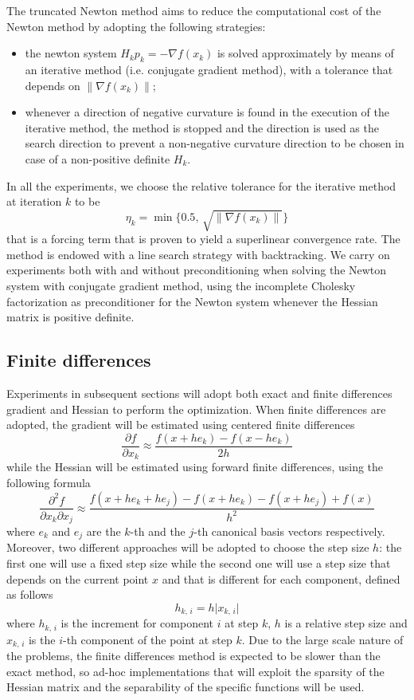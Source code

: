 The truncated Newton method aims to reduce the computational cost of the Newton method by adopting the following strategies:
\begin{itemize}
    \item the newton system $H_k p_k = -\nabla f(x_k)$ is solved approximately by means of an iterative method (i.e. conjugate gradient method), with a tolerance that depends on $\lVert \nabla f(x_k) \rVert$;
    \item whenever a direction of negative curvature is found in the execution of the iterative method, the method is stopped and the direction is used as the search direction to prevent a non-negative curvature direction to be chosen in case of a non-positive definite $H_k$.
\end{itemize}
In all the experiments, we choose the relative tolerance for the iterative method at iteration $k$ to be 
\[
\eta_k = \min\{0.5,\, \sqrt{\lVert \nabla f(x_k) \rVert}\}
\]
that is a forcing term that is proven to yield a superlinear convergence rate.
The method is endowed with a line search strategy with backtracking.
We carry on experiments both with and without preconditioning when solving the Newton system with conjugate gradient method, using the incomplete Cholesky factorization as preconditioner for the Newton system whenever the Hessian matrix is positive definite.

\subsection{Finite differences}

Experiments in subsequent sections will adopt both exact and finite differences gradient and Hessian to perform the optimization.
When finite differences are adopted, the gradient will be estimated using centered finite differences
\begin{equation}
    \label{eq:findiff_gradient}
    \frac{\partial f}{\partial x_k} \approx \frac{f(x + he_k) - f(x - he_k)}{2h}
\end{equation}
while the Hessian will be estimated using forward finite differences, using the following formula
\begin{equation}
    \label{eq:findiff_hessian}
    \frac{\partial^2 f}{\partial x_k \partial x_j} \approx \frac{f(x + he_k + he_j) - f(x + he_k) - f(x + he_j) + f(x)}{h^2}
\end{equation}
where $e_k$ and $e_j$ are the $k$-th and the $j$-th canonical basis vectors respectively.
Moreover, two different approaches will be adopted to choose the step size $h$: the first one will use a fixed step size while the second one will use a step size that depends on the current point $x$ and that is different for each component, defined as follows
\[
h_{k,\,i} = h \lvert x_{k,\,i} \rvert
\]
where $h_{k,\,i}$ is the increment for component $i$ at step $k$, $h$ is a relative step size and $x_{k,\,i}$ is the $i$-th component of the point at step $k$.
Due to the large scale nature of the problems, the finite differences method is expected to be slower than the exact method, so ad-hoc implementations that will exploit the sparsity of the Hessian matrix and the separability of the specific functions will be used.